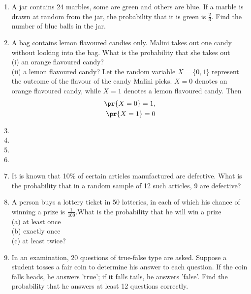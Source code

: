 \renewcommand{\theequation}{\theenumi}
\begin{enumerate}[label=\thesection.\arabic*.,ref=\thesection.\theenumi]


\item A jar contains 24 marbles, some are green and others are blue. If a marble is drawn at random from the jar, the probability that it is green is $\frac{2}{3}$. Find the number of blue balls in the jar.
\\
\solution

\item A bag contains lemon flavoured candies only. Malini takes out one candy without
looking into the bag. What is the probability that she takes out\\
(i) an orange flavoured candy?\\
(ii) a lemon flavoured candy?
\solution  Let the random variable $X=\{0,1\}$ represent the outcome of the flavour of the candy Malini picks. $X=0$ denotes an orange flavoured candy, while $X=1$ denotes a lemon flavoured candy.  Then 
\begin{align}
\pr{X=0} = 1,
\\
\pr{X=1} = 0
\end{align}
\item 
\item 
\item 
\item 

\item It is known that 10$\%$ of certain articles manufactured are defective. What is the probability that in a random sample of 12 such articles, 9 are defective?\\
\item A person buys a lottery ticket in 50 lotteries, in each of which his chance of
winning a prize is $\frac{1}{100}$.What is the probability that he will win a prize\\
(a) at least once \\
(b) exactly once \\
(c) at least twice?\\

\item In an examination, 20 questions of true-false type are asked. Suppose a student tosses a fair coin to determine his answer to each question. If the coin falls heads, he answers 'true'; if it falls tails, he answers 'false'. Find the probability that he answers at least 12 questions correctly.\\
\solution



\end{enumerate}
